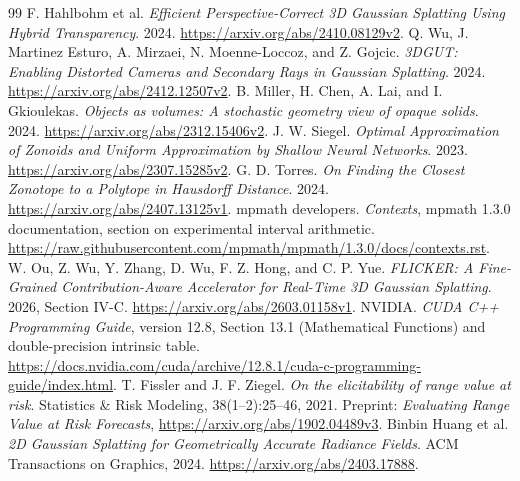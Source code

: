 \documentclass[11pt,a4paper]{article}
\begin{document}
\begin{thebibliography}{99}
F. Hahlbohm et al. \emph{Efficient Perspective-Correct 3D Gaussian
Splatting Using Hybrid Transparency}. 2024.
\url{https://arxiv.org/abs/2410.08129v2}.
Q. Wu, J. Martinez Esturo, A. Mirzaei, N. Moenne-Loccoz, and Z. Gojcic.
\emph{3DGUT: Enabling Distorted Cameras and Secondary Rays in Gaussian
Splatting}. 2024. \url{https://arxiv.org/abs/2412.12507v2}.
B. Miller, H. Chen, A. Lai, and I. Gkioulekas.
\emph{Objects as volumes: A stochastic geometry view of opaque solids}.
2024. \url{https://arxiv.org/abs/2312.15406v2}.
J. W. Siegel. \emph{Optimal Approximation of Zonoids and Uniform
Approximation by Shallow Neural Networks}.
2023. \url{https://arxiv.org/abs/2307.15285v2}.
G. D. Torres. \emph{On Finding the Closest Zonotope to a Polytope in
Hausdorff Distance}. 2024. \url{https://arxiv.org/abs/2407.13125v1}.
mpmath developers. \emph{Contexts}, mpmath 1.3.0 documentation,
section on experimental interval arithmetic.
\url{https://raw.githubusercontent.com/mpmath/mpmath/1.3.0/docs/contexts.rst}.
W. Ou, Z. Wu, Y. Zhang, D. Wu, F. Z. Hong, and C. P. Yue.
\emph{FLICKER: A Fine-Grained Contribution-Aware Accelerator for
Real-Time 3D Gaussian Splatting}. 2026, Section IV-C.
\url{https://arxiv.org/abs/2603.01158v1}.
NVIDIA. \emph{CUDA C++ Programming Guide}, version 12.8,
Section 13.1 (Mathematical Functions) and double-precision intrinsic table.
\url{https://docs.nvidia.com/cuda/archive/12.8.1/cuda-c-programming-guide/index.html}.
T. Fissler and J. F. Ziegel.
\emph{On the elicitability of range value at risk}.
Statistics \& Risk Modeling, 38(1--2):25--46, 2021.
Preprint: \emph{Evaluating Range Value at Risk Forecasts},
\url{https://arxiv.org/abs/1902.04489v3}.
Binbin Huang et al.
\emph{2D Gaussian Splatting for Geometrically Accurate Radiance Fields}.
ACM Transactions on Graphics, 2024.
\url{https://arxiv.org/abs/2403.17888}.


\end{thebibliography}
\end{document}
